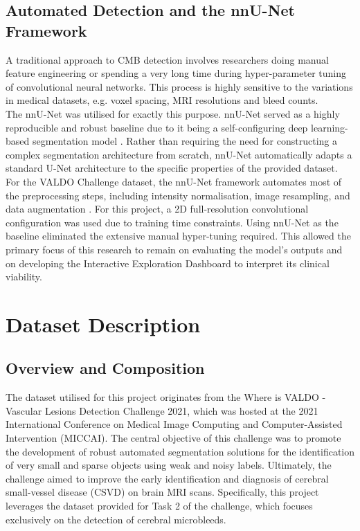 \documentclass{aifyp}
\begin{document}
\subsection{Automated Detection and the nnU-Net Framework}
A traditional approach to CMB detection involves researchers doing manual feature engineering or spending a very long time during hyper-parameter tuning of convolutional neural networks. This process is highly sensitive to the variations in medical datasets, e.g. voxel spacing, MRI resolutions and bleed counts.\cite{cmbDetection}
\\ 

The nnU-Net was utilised for exactly this purpose. nnU-Net served as a highly reproducible and robust baseline due to it being a self-configuring deep learning-based segmentation model \cite{nnUNet}. Rather than requiring the need for constructing a complex segmentation architecture from scratch, nnU-Net automatically adapts a standard U-Net architecture to the specific properties of the provided dataset. 
\\

For the VALDO Challenge dataset, the nnU-Net framework automates most of the preprocessing steps, including intensity normalisation, image resampling, and data augmentation \cite{nnUNet}. For this project, a 2D full-resolution convolutional configuration was used due to training time constraints. Using nnU-Net as the baseline eliminated the extensive manual hyper-tuning required. This allowed the primary focus of this research to remain on evaluating the model's outputs and on developing the Interactive Exploration Dashboard to interpret its clinical viability.


\pagebreak

\section{Dataset Description}

\subsection{Overview and Composition}

The dataset utilised for this project originates from the Where is VALDO - Vascular Lesions Detection Challenge 2021, which was hosted at the 2021 International Conference on Medical Image Computing and Computer-Assisted Intervention (MICCAI). The central objective of this challenge was to promote the development of robust automated segmentation solutions for the identification of very small and sparse objects using weak and noisy labels. Ultimately, the challenge aimed to improve the early identification and diagnosis of cerebral small-vessel disease (CSVD) on brain MRI scans. Specifically, this project leverages the dataset provided for Task 2 of the challenge, which focuses exclusively on the detection of cerebral microbleeds.\cite{valdoChallenge2021, valdoDataset, valdoPaper}
\\
 
\end{document}
